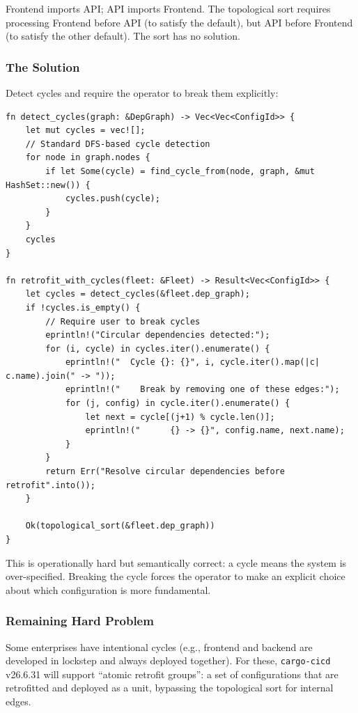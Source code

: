 Frontend imports API; API imports Frontend. The topological sort requires processing Frontend before API (to satisfy the default), but API before Frontend (to satisfy the other default). The sort has no solution.

\subsubsection{The Solution}

Detect cycles and require the operator to break them explicitly:

\begin{lstlisting}[caption={Cycle detection and resolution}]
fn detect_cycles(graph: &DepGraph) -> Vec<Vec<ConfigId>> {
    let mut cycles = vec![];
    // Standard DFS-based cycle detection
    for node in graph.nodes {
        if let Some(cycle) = find_cycle_from(node, graph, &mut HashSet::new()) {
            cycles.push(cycle);
        }
    }
    cycles
}

fn retrofit_with_cycles(fleet: &Fleet) -> Result<Vec<ConfigId>> {
    let cycles = detect_cycles(&fleet.dep_graph);
    if !cycles.is_empty() {
        // Require user to break cycles
        eprintln!("Circular dependencies detected:");
        for (i, cycle) in cycles.iter().enumerate() {
            eprintln!("  Cycle {}: {}", i, cycle.iter().map(|c| c.name).join(" -> "));
            eprintln!("    Break by removing one of these edges:");
            for (j, config) in cycle.iter().enumerate() {
                let next = cycle[(j+1) % cycle.len()];
                eprintln!("      {} -> {}", config.name, next.name);
            }
        }
        return Err("Resolve circular dependencies before retrofit".into());
    }

    Ok(topological_sort(&fleet.dep_graph))
}
\end{lstlisting}

This is operationally hard but semantically correct: a cycle means the system is over-specified. Breaking the cycle forces the operator to make an explicit choice about which configuration is more fundamental.

\subsubsection{Remaining Hard Problem}

Some enterprises have intentional cycles (e.g., frontend and backend are developed in lockstep and always deployed together). For these, \texttt{cargo-cicd} v26.6.31 will support ``atomic retrofit groups'': a set of configurations that are retrofitted and deployed as a unit, bypassing the topological sort for internal edges.


